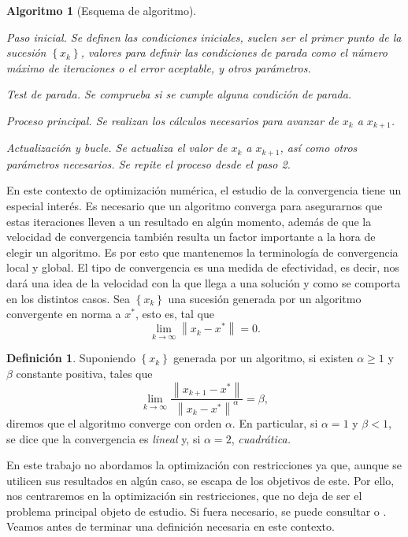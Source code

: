 \documentclass[11pt,a4paper]{book}
\newtheorem{algorithm}[theorem]{Algoritmo}
\theoremstyle{definition}
\newtheorem{definition}[theorem]{Definición}
\theoremstyle{remark}
\newcommand{\norm}[1]{\left\lVert#1\right\rVert}
\newcommand{\sucesionxk}{\left\{x_k\right\}}
\begin{document}
\begin{algorithm}[Esquema de algoritmo] \leavevmode
	\label{alg:esquema}
	\begin{steps}
		\item Paso inicial. Se definen las condiciones iniciales, suelen ser el primer
		punto de la sucesión $\sucesionxk$, valores para definir las condiciones de
		parada como el número máximo de iteraciones o el error aceptable, y otros parámetros.
		\item Test de parada. Se comprueba si se cumple alguna condición de parada.
		\item Proceso principal. Se realizan los cálculos necesarios para avanzar de
		$x_k$ a $x_{k+1}$.
		\item Actualización y bucle. Se actualiza el valor de $x_k$ a $x_{k+1}$, así como otros parámetros necesarios. Se repite el proceso desde el \textit{paso 2.}
	\end{steps}
\end{algorithm}

En este contexto de optimización numérica, el estudio de la convergencia tiene un especial interés. Es necesario que un algoritmo converga para asegurarnos que estas iteraciones lleven a un resultado en algún momento, además de que la velocidad de convergencia también resulta un factor importante a la hora de elegir un algoritmo.
Es por esto que mantenemos la terminología de convergencia local y global. El tipo de convergencia es una medida
de efectividad, es decir, nos dará una idea de la velocidad con la que llega a una solución y como se comporta en los distintos casos. Sea
$\sucesionxk$ una sucesión generada por un algoritmo convergente en norma a $x^*$, esto es, tal que
\begin{equation}
	\lim_{k \to \infty} \norm{x_k-x^*} = 0.
\end{equation}
\begin{definition}
Suponiendo $\sucesionxk$ generada por un algoritmo, si existen $\alpha\geq 1$ y $\beta$ constante positiva, tales que
\begin{equation}
	\lim_{k \to \infty} \frac{\norm{x_{k+1}-x^*}}{\norm{x_k-x^*}^\alpha}=\beta,
\end{equation}
diremos que el algoritmo converge con orden $\alpha$. En particular, si $\alpha=1$
y $\beta<1$, se dice que la convergencia es \textit{lineal} y, si $\alpha=2$,
\textit{cuadrática.}
\end{definition}

En este trabajo no abordamos la optimización con restricciones ya que, aunque se utilicen sus resultados en algún caso, se escapa de los objetivos de este. Por ello, nos centraremos en la optimización sin restricciones, que no deja de ser el problema principal objeto de estudio. Si fuera necesario, se puede consultar \cite[Capítulo 8]{Sun2006-au} o \cite[Capítulo 12]{Nocedal2006-kh}. Veamos antes de terminar una definición necesaria en este contexto.
\end{document}
